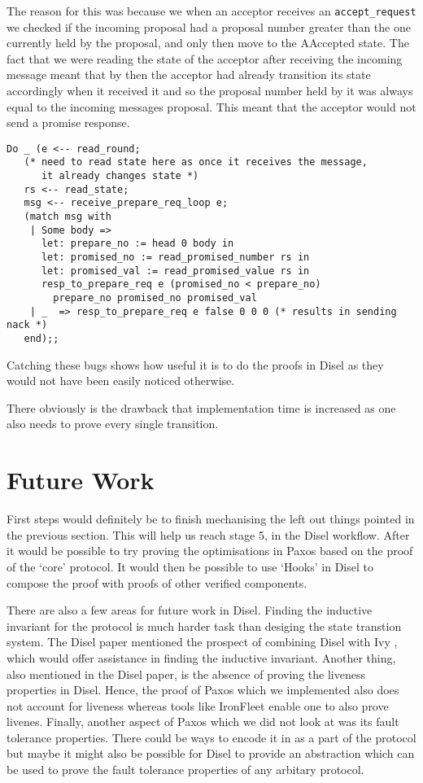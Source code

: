 The reason for this was because we when an acceptor receives an \texttt{accept\_request}
we checked if the incoming proposal had a proposal number greater than the one
currently held by the proposal, and only then move to the AAccepted state. The fact
that we were reading the state of the acceptor after receiving the incoming message
meant that by then the acceptor had already transition its state accordingly
when it received it and so the proposal number held by it was always
equal to the incoming messages proposal. This meant that the acceptor would not
send a promise response.

\begin{lstlisting}
Do _ (e <-- read_round;
   (* need to read state here as once it receives the message,
      it already changes state *)
   rs <-- read_state;
   msg <-- receive_prepare_req_loop e;
   (match msg with
    | Some body =>
      let: prepare_no := head 0 body in
      let: promised_no := read_promised_number rs in
      let: promised_val := read_promised_value rs in
      resp_to_prepare_req e (promised_no < prepare_no)
        prepare_no promised_no promised_val
    | _  => resp_to_prepare_req e false 0 0 0 (* results in sending nack *)
   end);;
\end{lstlisting}

Catching these bugs shows how useful it is to do the proofs in Disel as they
would not have been easily noticed otherwise.

There obviously is the drawback that implementation time is increased as one
also needs to prove every single transition.


\section{Future Work}
First steps would definitely be to finish mechanising the left out things
pointed in the previous section. This will help us reach stage 5, in the Disel
workflow. After it would be possible to try proving the optimisations
in Paxos based on the proof of the `core' protocol. It would then be possible
to use `Hooks' \cite{9} in Disel to compose the proof with proofs of other
verified components.

There are also a few areas for future work in Disel.
Finding the inductive invariant for the protocol is much harder task than
desiging the state transtion system. The Disel paper \cite{9} mentioned the prospect
of combining Disel with Ivy \cite{19}, which would offer assistance in finding
the inductive invariant. Another thing, also mentioned in the Disel paper, is
the absence of proving the liveness properties in Disel. Hence, the proof of
Paxos which we implemented also does not account for liveness whereas tools like
IronFleet \cite{15} enable one to also prove livenes.
Finally, another aspect of Paxos which we did not look at was its fault
tolerance properties. There could be ways to encode it in as a part of the
protocol but maybe it might also be possible for Disel to provide an
abstraction which can be used to prove the fault tolerance properties of
any arbitary protocol.
